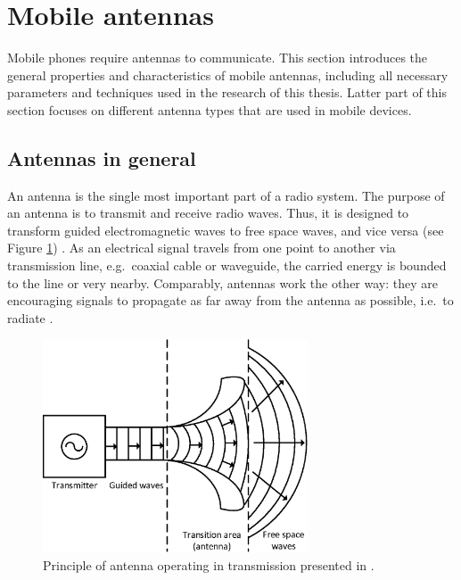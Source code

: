 \section{Mobile antennas}
\label{sec:mobile_antennas}
Mobile phones require antennas to communicate. This section introduces the general properties and characteristics of mobile antennas, including all necessary parameters and techniques used in the research of this thesis. Latter part of this section focuses on different antenna types that are used in mobile devices.

\subsection{Antennas in general}
\label{sec:general_antennas}
An antenna is the single most important part of a radio system. The purpose of an antenna is to transmit and receive radio waves. Thus, it is designed to transform guided electromagnetic waves to free space waves, and vice versa (see Figure \ref{fig:antenna_principle}) \cite{holopainen_phd}. As an electrical signal travels from one point to another via transmission line, e.g.\ coaxial cable or waveguide, the carried energy is bounded to the line or very nearby. Comparably, antennas work the other way: they are encouraging signals to propagate as far away from the antenna as possible, i.e.\ to radiate \cite{stutzman}.

\begin{figure}[H]
    \centering
    \includegraphics[width=0.7\textwidth]{img/antenna_principle.eps}
    \caption{Principle of antenna operating in transmission presented in \cite{saunders}.}
    \label{fig:antenna_principle}
\end{figure}

